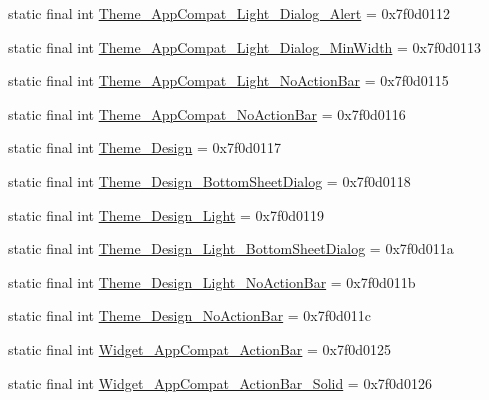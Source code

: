 \begin{DoxyCompactItemize}
\item 
static final int \mbox{\hyperlink{classandroid_1_1support_1_1design_1_1_r_1_1style_a38330218cb951a3bf1e25e103383efb9}{Theme\+\_\+\+App\+Compat\+\_\+\+Light\+\_\+\+Dialog\+\_\+\+Alert}} = 0x7f0d0112
\item 
static final int \mbox{\hyperlink{classandroid_1_1support_1_1design_1_1_r_1_1style_af2fcec3a17d1266c1aa09404150083c0}{Theme\+\_\+\+App\+Compat\+\_\+\+Light\+\_\+\+Dialog\+\_\+\+Min\+Width}} = 0x7f0d0113
\item 
static final int \mbox{\hyperlink{classandroid_1_1support_1_1design_1_1_r_1_1style_add69b6a7a05e046750100674904246de}{Theme\+\_\+\+App\+Compat\+\_\+\+Light\+\_\+\+No\+Action\+Bar}} = 0x7f0d0115
\item 
static final int \mbox{\hyperlink{classandroid_1_1support_1_1design_1_1_r_1_1style_a908dbe9e5db2dcaaa875b2b3076e6986}{Theme\+\_\+\+App\+Compat\+\_\+\+No\+Action\+Bar}} = 0x7f0d0116
\item 
static final int \mbox{\hyperlink{classandroid_1_1support_1_1design_1_1_r_1_1style_aa6796c89937f6e8b6b04b941eee44a5d}{Theme\+\_\+\+Design}} = 0x7f0d0117
\item 
static final int \mbox{\hyperlink{classandroid_1_1support_1_1design_1_1_r_1_1style_a05188dcbcc8c3841fac2c1daaed4d968}{Theme\+\_\+\+Design\+\_\+\+Bottom\+Sheet\+Dialog}} = 0x7f0d0118
\item 
static final int \mbox{\hyperlink{classandroid_1_1support_1_1design_1_1_r_1_1style_a27db99a1790aa46efd7c27e61378587a}{Theme\+\_\+\+Design\+\_\+\+Light}} = 0x7f0d0119
\item 
static final int \mbox{\hyperlink{classandroid_1_1support_1_1design_1_1_r_1_1style_aefdcef3769b44e270b497ed77e7723c9}{Theme\+\_\+\+Design\+\_\+\+Light\+\_\+\+Bottom\+Sheet\+Dialog}} = 0x7f0d011a
\item 
static final int \mbox{\hyperlink{classandroid_1_1support_1_1design_1_1_r_1_1style_aeb5bcafc332033d28688b206776ffada}{Theme\+\_\+\+Design\+\_\+\+Light\+\_\+\+No\+Action\+Bar}} = 0x7f0d011b
\item 
static final int \mbox{\hyperlink{classandroid_1_1support_1_1design_1_1_r_1_1style_a383114c8b35611f608ba67f8cc1f1803}{Theme\+\_\+\+Design\+\_\+\+No\+Action\+Bar}} = 0x7f0d011c
\item 
static final int \mbox{\hyperlink{classandroid_1_1support_1_1design_1_1_r_1_1style_ac6fabcbdfed53c737b1f84943d09135e}{Widget\+\_\+\+App\+Compat\+\_\+\+Action\+Bar}} = 0x7f0d0125
\item 
static final int \mbox{\hyperlink{classandroid_1_1support_1_1design_1_1_r_1_1style_ab97887a30acd25327d0b7891149466a8}{Widget\+\_\+\+App\+Compat\+\_\+\+Action\+Bar\+\_\+\+Solid}} = 0x7f0d0126

\end{DoxyCompactItemize}
